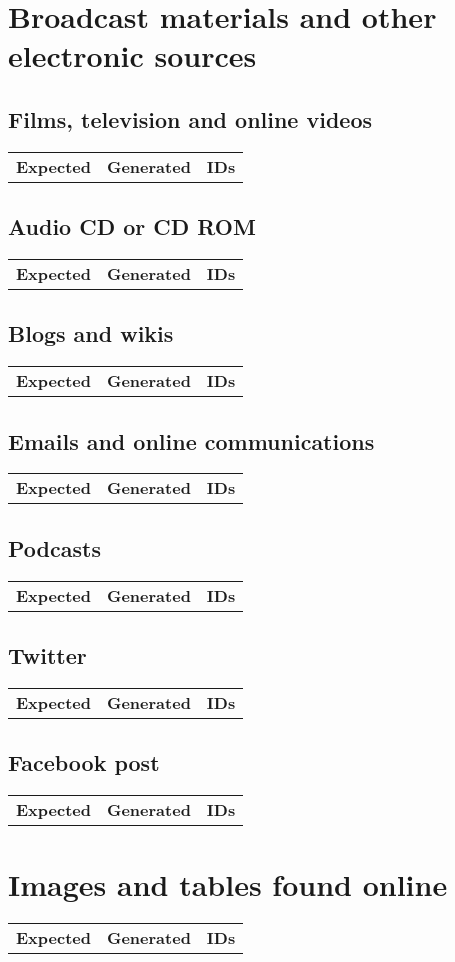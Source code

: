 \documentclass[a4paper,landscape,12pt]{article}
\newlength\q
\newlength\qr
\newenvironment{citetable}
  {\noindent\begin{longtable}{p{\q} p{\q} p{\qr}}\textbf{Expected} & \textbf{Generated} & \textbf{IDs}\\}
  {\end{longtable}}
\begin{document}
\section{Broadcast materials and other electronic sources}

\subsection{Films, television and online videos}

\begin{citetable}
\end{citetable}

\subsection{Audio CD or CD ROM}

\begin{citetable}
\end{citetable}

\subsection{Blogs and wikis}

\begin{citetable}
\end{citetable}

\subsection{Emails and online communications}

\begin{citetable}
\end{citetable}

\subsection{Podcasts}

\begin{citetable}
\end{citetable}

\subsection{Twitter}

\begin{citetable}
\end{citetable}

\subsection{Facebook post}

\begin{citetable}
\end{citetable}

\section{Images and tables found online}

\begin{citetable}
\end{citetable}

\printbibliography
	
\end{document}
